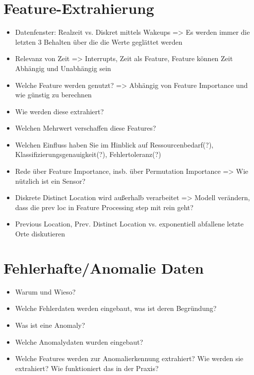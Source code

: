 \section{Feature-Extrahierung}
\begin{itemize}
    \item Datenfenster: Realzeit vs. Diskret mittels Wakeups => Es werden immer die letzten 3 Behalten über die die Werte geglättet werden
    \item Relevanz von Zeit => Interrupts, Zeit als Feature, Feature können Zeit Abhängig und Unabhängig sein
    \item Welche Feature werden genutzt? => Abhängig von Feature Importance und wie günstig zu berechnen
    \item Wie werden diese extrahiert?
    \item Welchen Mehrwert verschaffen diese Features?
    \item Welchen Einfluss haben Sie im Hinblick auf Ressourcenbedarf(?), Klassifizierungsgenauigkeit(?), Fehlertoleranz(?)
    \item Rede über Feature Importance, insb. über Permutation Importance => Wie nützlich ist ein Sensor?
    \item Diskrete Distinct Location wird außerhalb verarbeitet => Modell verändern, dass die prev loc in Feature Processing step mit rein geht?
    \item Previous Location, Prev. Distinct Location vs. exponentiell abfallene letzte Orte diskutieren
\end{itemize}

\section{Fehlerhafte/Anomalie Daten}
\label{sec:data_anomalie}
\begin{itemize}
    \item Warum und Wieso?
    \item Welche Fehlerdaten werden eingebaut, was ist deren Begründung?
    \item Was ist eine Anomaly?
    \item Welche Anomalydaten wurden eingebaut?
    \item Welche Features werden zur Anomalierkennung extrahiert? Wie werden sie extrahiert? Wie funktioniert das in der Praxis?
\end{itemize}

